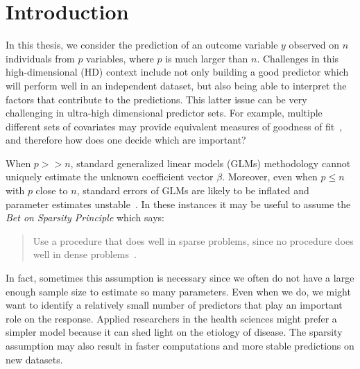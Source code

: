 \chapter{Introduction\label{ch:introduction}}


In this thesis, we consider the prediction of an outcome variable $y$ observed on $n$ individuals from $p$ variables, where $p$ is much larger than $n$. 
Challenges in this high-dimensional (HD) context include not only building a good predictor which will perform well in an independent dataset, but also being able to interpret the factors that contribute to the predictions. 
This latter issue can be very challenging in ultra-high dimensional predictor sets. 
For example, multiple different sets of covariates may provide equivalent measures of goodness of fit~\citep{fan2014challenges}, and therefore how does one decide which are important? 

When $p >>n$, standard generalized linear models (GLMs) methodology cannot uniquely estimate the unknown coefficient vector $\beta$. 
Moreover, even when $p \leq n$ with $p$ close to $n$, standard errors of GLMs are likely to be inflated and parameter estimates unstable~\citep{reid2016study}. In these instances it may be useful to assume the \textit{Bet on Sparsity Principle} which says:
\begin{quote}
Use a procedure that does well in sparse problems,
since no procedure does well in dense problems~\citep{friedman2001elements}.
\end{quote}
In fact, sometimes this assumption is necessary since we often do not have a large enough sample size to estimate so many parameters. Even when we do, we might want to identify a relatively small number of predictors that play an important role on the response. Applied researchers in the health sciences might prefer a simpler model because it can shed light on the etiology of disease. The sparsity assumption may also result in faster computations and more stable predictions on new datasets. 

